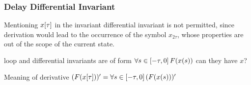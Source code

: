 \documentclass[10pt]{report}
\begin{document}
\begin{sidewaysfigure}
\begin{sequentdeduction}
{                }
            \end{sequentdeduction}
            \begin{sequentdeduction}
            \end{sequentdeduction}
            \end{sidewaysfigure}
            \normalsize

        \subsubsection{Delay Differential Invariant}
            \label{sec:delay-differential-invariant}

            Mentioning $x[\tau]$ in the invariant differential invariant is not permitted, since derivation would lead to the occurrence of the symbol $x_{2\tau}$, whose properties are out of the scope of the current state.

            loop and differential invariants are of form $\forall s\in[-\tau,0]{\,} F(x(s))$
            can they have $x$?

            Meaning of derivative $(F(x[\tau]))'=\forall s\in[-\tau,0]{\,} (F(x(s)))'$
\end{document}
